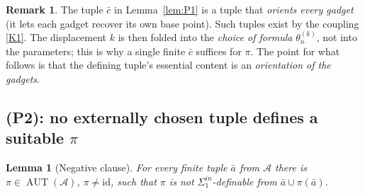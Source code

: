 \documentclass[12pt,fullpage]{article}
\newtheorem{lemma}[theorem]{Lemma}
\theoremstyle{definition}
\newtheorem{remark}[theorem]{Remark}
\newcommand{\A}{\mathcal{A}}
\newcommand{\AUT}{\operatorname{AUT}}
\begin{document}
\begin{remark}\label{rem:per-pi}
The tuple $\bar c$ in Lemma~\ref{lem:P1} is a tuple that \emph{orients every
gadget} (it lets each gadget recover its own base point).  Such tuples exist
by the coupling \ref{K1}.  The displacement $k$ is then folded into the
\emph{choice of formula} $\theta_n^{(k)}$, not into the parameters; this is
why a single finite $\bar c$ suffices for $\pi$.  The point for what follows
is that the defining tuple's essential content is an \emph{orientation of the
gadgets}.
\end{remark}

\subsection*{(P2): no externally chosen tuple defines a suitable $\pi$}

\begin{lemma}[Negative clause]\label{lem:P2}
For every finite tuple $\bar a$ from $\A$ there is $\pi\in\AUT(\A)$,
$\pi\neq\mathrm{id}$, such that $\pi$ is \emph{not} $\Sigma^{in}_1$-definable
from $\bar a\cup\pi(\bar a)$.
\end{lemma}
\end{document}
